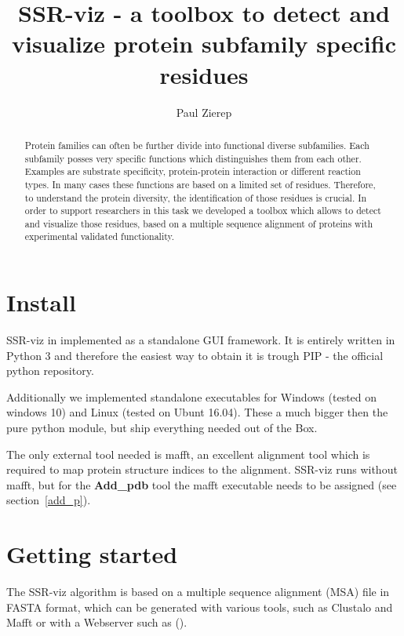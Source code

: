 \documentclass[a4paper,10pt]{article}
\title{SSR-viz - a toolbox to detect and visualize protein
subfamily specific residues}
\author{Paul Zierep}
\begin{document}
\maketitle

\begin{abstract}

Protein families can often be further divide into 
functional diverse subfamilies. Each subfamily posses very specific functions
which distinguishes them from each other. Examples are substrate specificity,
protein-protein interaction or different reaction types. In many cases these functions are
based on a limited set of residues. Therefore, to understand the protein diversity,
the identification of those residues is crucial.
In order to support researchers in this task we developed a toolbox
which allows to detect and visualize those residues, based on a multiple sequence 
alignment of proteins with experimental validated functionality.

\end{abstract}

\section{Install}


SSR-viz in implemented as a standalone GUI framework. It is entirely 
written in Python 3 and therefore the easiest way to obtain it is trough 
PIP - the official python repository. 

Additionally we implemented standalone 
executables for Windows (tested on windows 10) and Linux (tested on Ubunt 16.04).
These a much bigger then the pure python module, but ship everything needed out of
the Box. 

The only external tool needed is mafft, an excellent alignment tool which is 
required to map protein structure indices to the alignment. SSR-viz runs
without mafft, but for the \textbf{Add\_pdb} tool the mafft executable needs 
to be assigned (see section~\ref{add_p}).


\section{Getting started}

The SSR-viz algorithm is based on a multiple sequence alignment (MSA) file in 
FASTA format, which can be generated with various tools, such as Clustalo 
and Mafft or with a Webserver such as (). 
\end{document}
